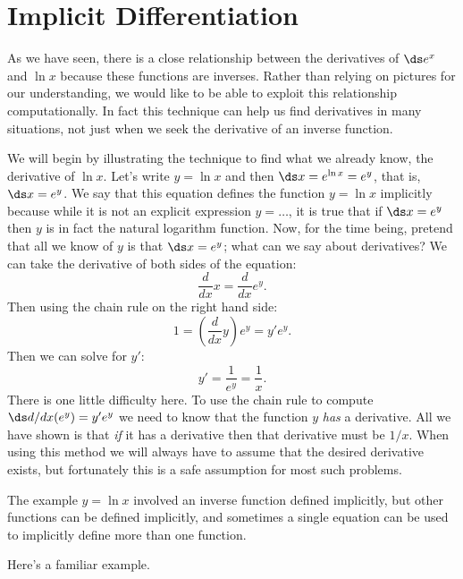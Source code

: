 \section{Implicit Differentiation}\label{sec:ImplicitDiff}
As we have seen, there is a close relationship 
between the derivatives of $\ds e^x$ and $\ln x$ because these functions
are inverses. Rather than relying on pictures for our understanding,
we would like to be able to exploit this relationship
computationally.  In fact this technique can help us find derivatives
in many situations, not just when we seek the derivative of an inverse
function. 

We will begin by illustrating the technique to find what we already
know, the derivative of $\ln x$. Let's write $y=\ln x$ and then
$\ds x=e^{\ln x}=e^y$, that is, $\ds x=e^y$. We say that this equation
defines the function $y=\ln x$ 
implicitly because while it is not an explicit expression $y=\ldots$, it is true
that if $\ds x=e^y$ then $y$ is in fact the natural logarithm
function. Now, for the time being, pretend that all we know of $y$ is
that $\ds x=e^y$; what can we say about derivatives? We can take the
derivative of both sides of the equation:
$$\frac{d}{dx}x=\frac{d}{dx}e^y.$$
Then using the chain rule on the right hand side:
$$1 = \left(\frac{d}{dx}y\right) e^y = y'e^y.$$
Then we can solve for $y'$:
$$y'=\frac{1}{e^y} = \frac{1}{x}.$$
There is one little difficulty here. To use the chain rule to compute 
$\ds d/dx(e^y)=y'e^y$ we need to know that the function $y$ {\it has} a
derivative. All we have shown is that {\it if} it has a derivative
then that derivative must be $1/x$. When using this method we will
always have to assume that the desired derivative exists, but
fortunately this is a safe assumption for most such problems. 
 
The example $y=\ln x$ involved an inverse function defined implicitly,
but other functions can be defined implicitly, and sometimes a single
equation can be used to implicitly define more than one
function. 

Here's a familiar example.

